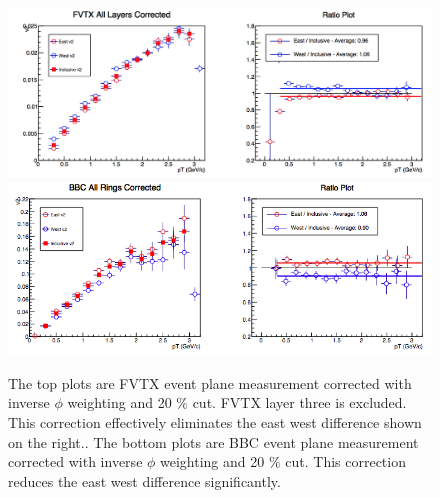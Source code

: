 \begin{figure}[!h]
\begin{center}
\includegraphics[width=0.75\linewidth]{figs/fvtx_corrected.png}
\includegraphics[width=0.75\linewidth]{figs/bbc_pp_correction.png}
\caption{The top plots are FVTX event plane measurement corrected with inverse $\phi$ weighting and 20 $\%$ cut. FVTX layer three is excluded. This correction effectively eliminates the east west difference shown on the right.. The bottom plots are BBC event plane measurement corrected with inverse $\phi$ weighting and 20 $\%$ cut. This correction reduces the east west difference significantly.}
\label{fig:fvtx_corrected_best}
\end{center}
\end{figure}
\clearpage

